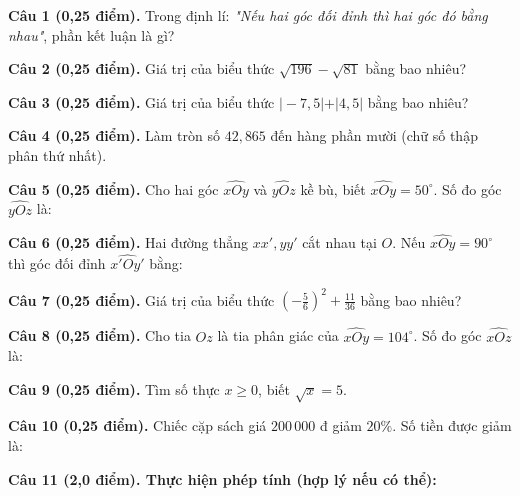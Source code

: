 \documentclass[12pt,a4paper]{article}
\begin{document}
\noindent\textbf{Câu 1 (0,25 điểm).} Trong định lí: \textit{"Nếu hai góc đối đỉnh thì hai góc đó bằng nhau"}, phần kết luận là gì? \par\vspace{0.35mm}
\noindent\textbf{Câu 2 (0,25 điểm).} Giá trị của biểu thức $\sqrt{196} - \sqrt{81}$ bằng bao nhiêu? \par\vspace{0.35mm}
\noindent\textbf{Câu 3 (0,25 điểm).} Giá trị của biểu thức $\vert -7{,}5\vert + \vert 4{,}5\vert$ bằng bao nhiêu? \par\vspace{0.35mm}
\noindent\textbf{Câu 4 (0,25 điểm).} Làm tròn số $42{,}865$ đến hàng phần mười (chữ số thập phân thứ nhất). \par\vspace{0.35mm}
\noindent\textbf{Câu 5 (0,25 điểm).} Cho hai góc $\widehat{xOy}$ và $\widehat{yOz}$ kề bù, biết $\widehat{xOy} = 50^\circ$. Số đo góc $\widehat{yOz}$ là: \par\vspace{0.35mm}
\noindent\textbf{Câu 6 (0,25 điểm).} Hai đường thẳng $xx', yy'$ cắt nhau tại $O$. Nếu $\widehat{xOy} = 90^\circ$ thì góc đối đỉnh $\widehat{x'Oy'}$ bằng: \par\vspace{0.35mm}
\noindent\textbf{Câu 7 (0,25 điểm).} Giá trị của biểu thức $\left(-\frac{5}{6}\right)^2 + \frac{11}{36}$ bằng bao nhiêu? \par\vspace{0.35mm}
\noindent\textbf{Câu 8 (0,25 điểm).} Cho tia $Oz$ là tia phân giác của $\widehat{xOy} = 104^\circ$. Số đo góc $\widehat{xOz}$ là: \par\vspace{0.35mm}
\noindent\textbf{Câu 9 (0,25 điểm).} Tìm số thực $x \ge 0$, biết $\sqrt{x} = 5$. \par\vspace{0.35mm}
\noindent\textbf{Câu 10 (0,25 điểm).} Chiếc cặp sách giá $200\,000$ đ giảm $20\%$. Số tiền được giảm là: \par\vspace{0.35mm}
\vspace{0.6mm}

\noindent\textbf{Câu 11 (2,0 điểm). Thực hiện phép tính (hợp lý nếu có thể):}
\vspace{0.6mm}
\end{document}
